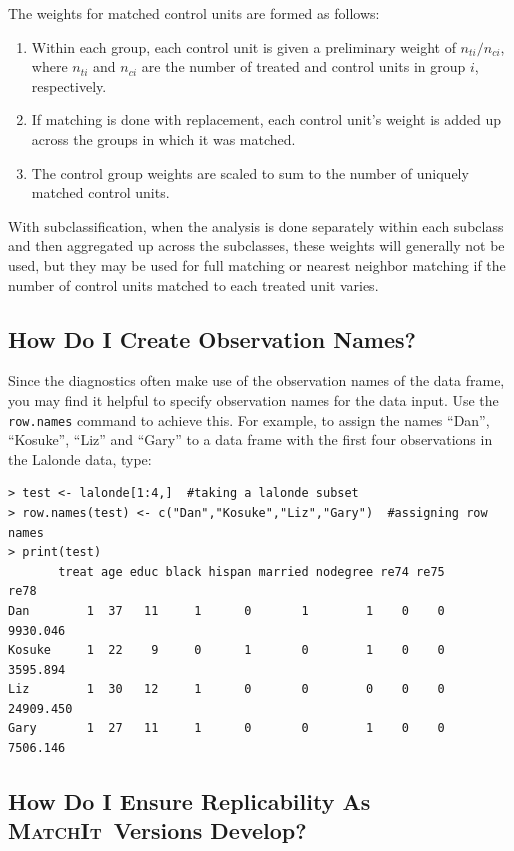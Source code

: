 \documentclass[oneside,letterpaper,titlepage]{article}
\newcommand{\MatchIt}{\textsc{MatchIt}}
\begin{document}
The weights for matched control units are formed as follows:
\begin{enumerate}
\item Within each group, each control unit is given a preliminary
  weight of $n_{ti}/n_{ci}$, where $n_{ti}$ and $n_{ci}$ are the
  number of treated and control units in group $i$, respectively.
\item If matching is done with replacement, each control unit's weight
  is added up across the groups in which it was matched.
\item The control group weights are scaled to sum to the number of
  uniquely matched control units.
\end{enumerate}

With subclassification, when the analysis is done separately within
each subclass and then aggregated up across the subclasses, these
weights will generally not be used, but they may be used for full
matching or nearest neighbor matching if the number of control units
matched to each treated unit varies.

\subsection{How Do I Create Observation Names?}
\label{rnames}

Since the diagnostics often make use of the observation names of the
data frame, you may find it helpful to specify observation names for
the data input.  Use the \texttt{row.names} command to achieve this.
For example, to assign the names ``Dan'', ``Kosuke'', ``Liz'' and
``Gary'' to a data frame with the first four observations in the
Lalonde data, type:

\begin{verbatim}
> test <- lalonde[1:4,]  #taking a lalonde subset
> row.names(test) <- c("Dan","Kosuke","Liz","Gary")  #assigning row names
> print(test)
       treat age educ black hispan married nodegree re74 re75      re78
Dan        1  37   11     1      0       1        1    0    0  9930.046
Kosuke     1  22    9     0      1       0        1    0    0  3595.894
Liz        1  30   12     1      0       0        0    0    0 24909.450
Gary       1  27   11     1      0       0        1    0    0  7506.146
\end{verbatim} 


\subsection{How Do I Ensure Replicability As \MatchIt\ Versions Develop?}
\end{document}
